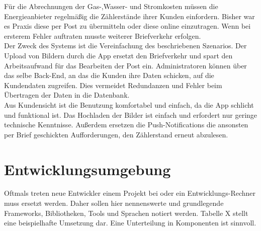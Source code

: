 Für die Abrechnungen der Gas-,Wasser- und Stromkosten müssen die Energieanbieter regelmäßig die Zählerstände ihrer
Kunden einfordern. Bisher war es Praxis diese per Post zu übermitteln oder diese online einzutragen. Wenn bei ersterem Fehler auftraten musste weiterer Briefverkehr erfolgen.\\
Der Zweck des Systems ist die Vereinfachung des beschriebenen Szenarios. Der Upload von Bildern durch die App ersetzt den Briefverkehr und spart den Arbeitsaufwand für das Bearbeiten der Post ein. Administratoren können über das selbe Back-End, an das die Kunden ihre Daten schicken, auf die Kundendaten zugreifen. Dies vermeidet Redundanzen und Fehler beim Übertragen der Daten in die Datenbank.\\
Aus Kundensicht ist die Benutzung komfortabel und einfach, da die App schlicht und funktional ist. Das Hochladen der Bilder ist einfach und erfordert nur geringe technische Kenntnisse. Außerdem ersetzen die Push-Notifications die ansonsten per Brief geschickten Aufforderungen, den Zählerstand erneut abzulesen.



\section{Entwicklungsumgebung}\label{sec:entwicklungsumgebung}
\begin{tcolorbox}
	Oftmals treten neue Entwickler einem Projekt bei oder ein Entwicklungs-Rechner muss ersetzt werden.
	Daher sollen hier nennenswerte und grundlegende Frameworks, Bibliotheken, Tools und Sprachen notiert werden.
	Tabelle X stellt eine beispielhafte Umsetzung dar.
	Eine Unterteilung in Komponenten ist sinnvoll.
\end{tcolorbox}

